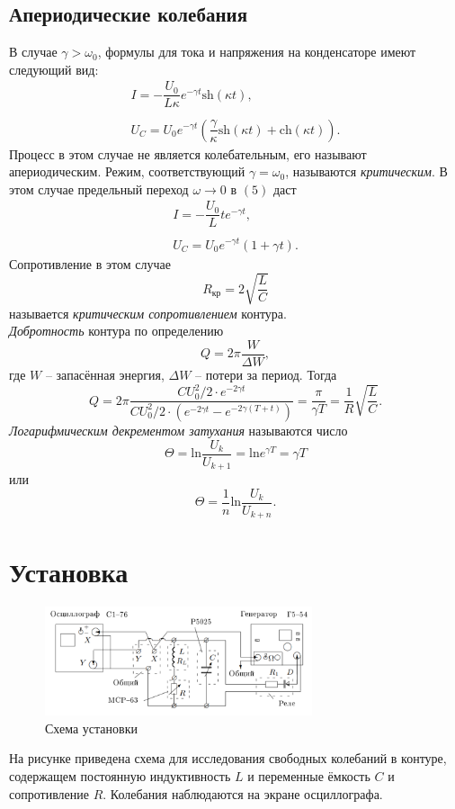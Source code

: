 \documentclass[a4paper,12pt]{article} %
\begin{document}
\subsection*{Апериодические колебания}
В случае $\gamma > \omega_0$, формулы для тока и напряжения на конденсаторе имеют следующий вид:
$$
\begin{array}{c}
I = -\dfrac{U_0}{L\kappa}e^{-\gamma t}\text{sh}(\kappa t),\\
\\
U_C = U_0 e^{-\gamma t}\left( \dfrac{\gamma}{\kappa}\text{sh}(\kappa t) + \text{ch}(\kappa t) \right).
\end{array}
$$
Процесс в этом случае не является колебательным, его называют апериодическим. Режим, соответствующий $\gamma = \omega_0$, называются \textit{критическим}. В этом случае предельный переход $\omega \rightarrow 0$ в $(5)$ даст 
$$
\begin{array}{c}
I = -\dfrac{U_0}{L}te^{-\gamma t},\\
\\
U_C=U_0 e^{-\gamma t}(1+\gamma t).
\end{array}
$$
Сопротивление в этом случае 
\begin{equation}
R_{\text{кр}}= 2 \sqrt{\dfrac{L}{C}}
\end{equation}
называется \textit{критическим сопротивлением} контура.\\
\textit{Добротность} контура по определению 
$$
Q = 2\pi \dfrac{W}{\Delta W},
$$ 
где $W$ -- запасённая энергия, $\Delta W$ -- потери за период. Тогда
$$
Q = 2\pi\dfrac{CU_0^2/2 \cdot e^{-2\gamma t}}{CU_0^2/2 \cdot (e^{-2\gamma t} - e^{-2\gamma (T+t)})}=\dfrac{\pi}{\gamma T}=\dfrac{1}{R}\sqrt{\dfrac{L}{C}}.
$$
\textit{Логарифмическим декрементом затухания} называются число
$$
\Theta = \text{ln}\dfrac{U_k}{U_{k+1}}=\text{ln} e^{\gamma T}=\gamma T
$$
или 
$$
\Theta = \dfrac{1}{n} \text{ln}\dfrac{U_k}{U_{k+n}}.
$$
\newpage
\section*{Установка}
\begin{figure}[h!]
\begin{center}
\includegraphics[width = 0.7\textwidth]{1.png}
\caption{Схема установки}
\end{center}
\end{figure}
На рисунке приведена схема для исследования свободных колебаний в контуре, содержащем постоянную индуктивность $L$ и переменные ёмкость $C$ и сопротивление $R$. Колебания наблюдаются на экране осциллографа.
\end{document}
